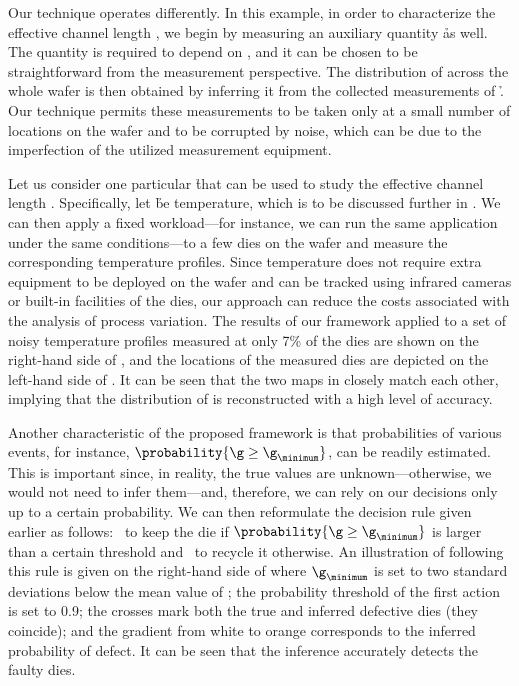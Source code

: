 Our technique operates differently. In this example, in order to characterize
the effective channel length \g, we begin by measuring an auxiliary quantity \h
as well. The quantity is required to depend on \g, and it can be chosen to be
straightforward from the measurement perspective. The distribution of \g across
the whole wafer is then obtained by inferring it from the collected measurements
of \h. Our technique permits these measurements to be taken only at a small
number of locations on the wafer and to be corrupted by noise, which can be due
to the imperfection of the utilized measurement equipment.

Let us consider one particular \h that can be used to study the effective
channel length \g. Specifically, let \h be temperature, which is to be discussed
further in . We can then apply a fixed workload---for
instance, we can run the same application under the same conditions---to a few
dies on the wafer and measure the corresponding temperature profiles. Since
temperature does not require extra equipment to be deployed on the wafer and can
be tracked using infrared cameras \cite{mesa-martinez2007} or built-in
facilities of the dies, our approach can reduce the costs associated with the
analysis of process variation. The results of our framework applied to a set of
noisy temperature profiles measured at only 7\% of the dies are shown on the
right-hand side of , and the locations of the measured
dies are depicted on the left-hand side of . It can
be seen that the two maps in  closely match each other,
implying that the distribution of \g is reconstructed with a high level of
accuracy.

Another characteristic of the proposed framework is that probabilities of
various events, for instance, $\probability{\g \geq \g_\minimum}$, can be
readily estimated. This is important since, in reality, the true values are
unknown---otherwise, we would not need to infer them---and, therefore, we can
rely on our decisions only up to a certain probability. We can then reformulate
the decision rule given earlier as follows: \one~to keep the die if
$\probability{\g \geq \g_\minimum}$ is larger than a certain threshold and
\two~to recycle it otherwise. An illustration of following this rule is given on
the right-hand side of  where $\g_\minimum$ is set
to two standard deviations below the mean value of \g; the probability threshold
of the first action is set to 0.9; the crosses mark both the true and inferred
defective dies (they coincide); and the gradient from white to orange
corresponds to the inferred probability of defect. It can be seen that the
inference accurately detects the faulty dies.

